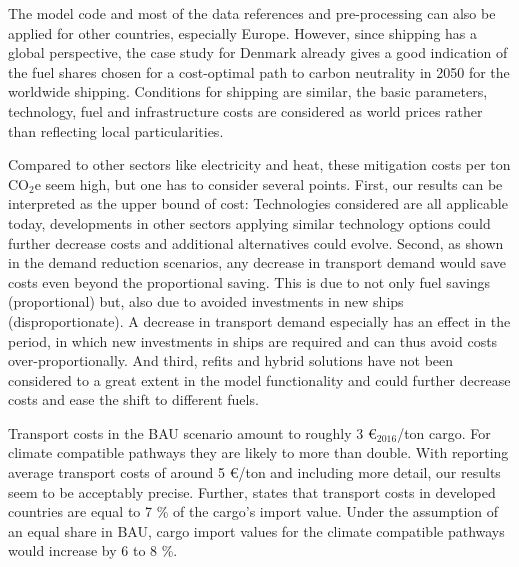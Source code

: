 \documentclass[article]{elsarticle}
\begin{document}
The model code and most of the data references and pre-processing can also be applied for other countries, especially Europe. However, since shipping has a global perspective, the case study for Denmark already gives a good indication of the fuel shares chosen for a cost-optimal path to carbon neutrality in 2050 for the worldwide shipping. Conditions for shipping are similar, the basic parameters, technology, fuel and infrastructure costs are considered as world prices rather than reflecting local particularities. %

Compared to other sectors like electricity and heat, these mitigation costs per ton CO$_2$e seem high, but one has to consider several points. First, our results can be interpreted as the upper bound of cost: Technologies considered are all applicable today, developments in other sectors applying similar technology options could further decrease costs and additional alternatives could evolve. Second, as shown in the demand reduction scenarios, any decrease in transport demand would save costs even beyond the proportional saving. This is due to not only fuel savings (proportional) but, also due to avoided investments in new ships (disproportionate). A decrease in transport demand especially has an effect in the period, in which new investments in ships are required and can thus avoid costs over-proportionally. And third, refits and hybrid solutions have not been considered to a great extent in the model functionality and could further decrease costs and ease the shift to different fuels.

Transport costs in the BAU scenario amount to roughly 3 \euro$_{2016}$/ton cargo. For climate compatible pathways they are likely to more than double. With \cite[p.~50]{UNCTAD2015} reporting average transport costs of around 5 \euro/ton and including more detail, our results seem to be acceptably precise. Further, \cite[p.~55]{UNCTAD2015} states that transport costs in developed countries are equal to 7 \% of the cargo's import value. Under the assumption of an equal share in BAU, cargo import values for the climate compatible pathways would increase by 6 to 8 \%.

\end{document}
